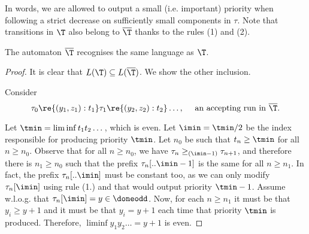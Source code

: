 In words, we are allowed to output a small (i.e. important) priority when following a strict decrease on sufficiently small components in $\tau$. 
Note that transitions in $\T$ also belong to $\overline \T$ thanks to the rules (1) and (2).


\begin{lemma}\label{lem:overline-T}
    The automaton $\overline \T$ recognises the same language as $\T$.
\end{lemma}
\begin{proof}
    It is clear that $L(\T) \subseteq L(\overline \T)$. We show the other inclusion.

    Consider
    \[\tau_0 \re{(y_1,z_1):t_1} \tau_1 \re{(y_2,z_2):t_2} \dots , \quad \text{ an accepting run in } \overline \T.\]

    Let $\tmin=\liminf t_1t_2\dots$, which is even.
    Let $\imin = \tmin/2$ be the index responsible for producing priority $\tmin$.
    Let $n_0$ be such that $t_n \geq \tmin$ for all $n \geq n_0$.
    Observe that for all $n \geq n_0$, we have $\tau_n \geq_{(\imin-1)} \tau_{n+1}$, and therefore there is $n_1 \geq n_0$ such that the prefix $\tau_n[..\imin-1]$ is the same for all $n \geq n_1$.
    In fact, the prefix $\tau_n[..\imin]$ must be constant too, as we can only modify $\tau_n[\imin]$ using rule (1.) and that would output priority $\tmin -1$.
    Assume w.l.o.g. that $\tau_n[\imin] = y\in \doneodd$.
    Now, for each $n \geq n_1$ it must be that $y_i\geq y+1$ and it must be that $y_i = y + 1$ each time that priority $\tmin$ is produced. 
    Therefore, $\liminf y_1y_2\dots = y+1$ is even.     
\end{proof}


